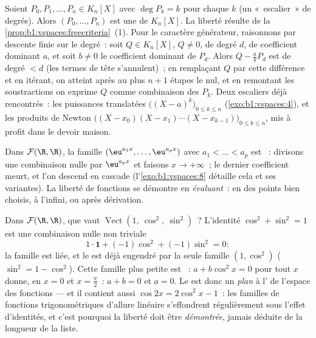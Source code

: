 \begin{example}
\label{ex:b1:vspaces:staircase}
Soient $P_0, P_1, \dots, P_n \in K_n[X]$ avec $\deg P_k = k$ pour
chaque $k$ (un «~escalier~» de degrés). Alors $(P_0, \dots, P_n)$ est
une  de $K_n[X]$. La liberté résulte de la
\cref{prop:b1:vspaces:freecriteria}~(1). Pour le caractère
générateur, raisonnons par descente finie sur le degré~: soit $Q \in
K_n[X]$, $Q \neq 0$, de degré $d$, de coefficient dominant $a$, et
soit $b \neq 0$ le coefficient dominant de $P_d$. Alors $Q -
\frac ab P_d$ est de degré $< d$ (les termes de tête s'annulent)~; en
remplaçant $Q$ par cette différence et en itérant, on atteint après au
plus $n + 1$ étapes le  nul, et en remontant les
soustractions on exprime $Q$ comme combinaison des $P_k$. Deux
escaliers déjà rencontrés~: les puissances translatées
$\bigl((X-a)^k\bigr)_{0 \leq k \leq n}$ (\cref{exo:b1:vspaces:4}), et
les produits de Newton
$\bigl((X - x_0)(X - x_1)\cdots(X - x_{k-1})\bigr)_{0 \leq k \leq
n}$, mis à profit dans le devoir maison.
\end{example}

\begin{example}\label{ex:b1:vspaces:functionfree}
Dans $\mathcal{F}(\R,\R)$, la famille $(\eu^{a_1 x}, \dots, \eu^{a_p
x})$ avec $a_1 < \dots < a_p$ est ~: divisons une combinaison
nulle par $\eu^{a_p x}$ et faisons $x \to +\infty$~; le dernier
coefficient meurt, et l'on descend en cascade
(l'\cref{exo:b1:vspaces:8} détaille cela et ses variantes). La liberté
de fonctions se démontre en \emph{évaluant}~: en des points bien
choisis, à l'infini, ou après dérivation.
\end{example}

\begin{example}
\label{ex:b1:vspaces:hiddenrelation}
Dans $\mathcal{F}(\R, \R)$, que vaut
$\operatorname{Vect}(1,\ \cos^2,\ \sin^2)$~? L'identité
$\cos^2 + \sin^2 = 1$ est une combinaison nulle non triviale
\[
1\cdot\mathbf{1} + (-1)\cos^2 + (-1)\sin^2 = 0 :
\]
la famille est liée, et le  est déjà engendré par
la seule famille $(1, \cos^2)$ ($\sin^2 = 1 - \cos^2$). Cette famille plus petite
est ~: $a + b\cos^2 x = 0$ pour tout $x$ donne, en $x = 0$ et
$x = \frac\pi2$~: $a + b = 0$ et $a = 0$. Le  est
donc un \emph{plan} à l' de l'espace des fonctions --- et il
contient aussi $\cos 2x = 2\cos^2 x - 1$~: les familles de fonctions
trigonométriques d'allure linéaire s'effondrent régulièrement sous
l'effet d'identités, et c'est pourquoi la liberté doit être
\emph{démontrée}, jamais déduite de la longueur de la liste.
\end{example}

